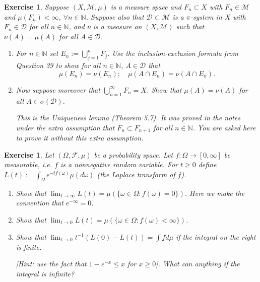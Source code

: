 \documentclass{article}
\newtheorem{exercise}[theorem]{Exercise}
\begin{document}
\begin{exercise}
Suppose \( (X, \mathcal{M}, \mu) \) is a measure space and \( F_n \subset X \) with \( F_n \in \mathcal{M} \) and \( \mu(F_n) < \infty \), \( \forall n \in \mathbb{N} \). Suppose also that \( \mathcal{D} \subset \mathcal{M} \) is a \(\pi\)-system in \( X \) with \( F_n \in \mathcal{D} \) for all \( n \in \mathbb{N} \), and \( \nu \) is a measure on \( (X, \mathcal{M}) \) such that \( \nu(A) = \mu(A) \) for all \( A \in \mathcal{D} \).
    
    \begin{enumerate}
        \item[(a)] For \( n \in \mathbb{N} \) set \( E_n := \bigcup_{j=1}^{n} F_j \). Use the inclusion-exclusion formula from Question 39 to show for all \( n \in \mathbb{N} \), \( A \in \mathcal{D} \) that
        \[
        \mu(E_n) = \nu(E_n); \quad \mu(A \cap E_n) = \nu(A \cap E_n).
        \]
        \item[(b)] Now suppose moreover that \( \bigcup_{n=1}^{\infty} F_n = X \). Show that \( \mu(A) = \nu(A) \) for all \( A \in \sigma(\mathcal{D}) \).
        
        \textit{This is the Uniqueness lemma (Theorem 5.7). It was proved in the notes under the extra assumption that \( F_n \subset F_{n+1} \) for all \( n \in \mathbb{N} \). You are asked here to prove it without this extra assumption.}
    \end{enumerate}
\end{exercise} 
\begin{exercise}
Let \( (\Omega, \mathcal{F}, \mu) \) be a probability space. Let \( f : \Omega \to [0, \infty] \) be measurable, i.e. \( f \) is a nonnegative random variable. For \( t \geq 0 \) define \( L(t) := \int_{\Omega} e^{-tf(\omega)}\mu(d\omega) \) (the \textit{Laplace transform} of \( f \)).
    
    \begin{enumerate}
        \item[(a)] Show that \( \lim_{t \to \infty} L(t) = \mu(\{\omega \in \Omega : f(\omega) = 0\}) \). Here we make the convention that \( e^{-\infty} = 0 \).
        \item[(b)] Show that \( \lim_{t \to 0} L(t) = \mu(\{\omega \in \Omega : f(\omega) < \infty\}) \).
        \item[(c)] Show that \( \lim_{t \to 0} t^{-1} (L(0) - L(t)) = \int f d\mu \) if the integral on the right is finite. 
        
        \textit{[Hint: use the fact that \( 1 - e^{-x} \leq x \) for \( x \geq 0 \)]. What can anything if the integral is infinite?}
    \end{enumerate}
\end{exercise}  
\end{document}
